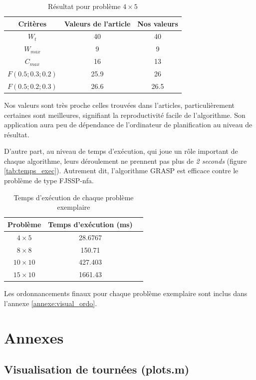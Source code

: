 \documentclass[10pt,a4paper]{scrartcl}
\begin{document}
\begin{table}[!h]
  \centering
  \begin{tabular}{|c|c|c|}
    \hline
    Critères & Valeurs de l'article & Nos valeurs \\
    \hline
    $W_t$ & 40 & 40 \\
    $W_{max}$ & 9 & 9 \\
    $C_{max}$ & 16 & 13 \\
    $F(0.5;0.3;0.2)$ & 25.9 & 26 \\
    $F(0.5;0.2;0.3)$ & 26.6 & 26.5 \\
    \hline
  \end{tabular}
  \caption{Résultat pour problème $4 \times 5$}
\end{table}

Nos valeurs sont très proche celles trouvées dans l'articles, particulièrement certaines sont meilleures, signifiant la reproductivité facile de l'algorithme. Son application aura peu de dépendance de l'ordinateur de planification au niveau de résultat.

D'autre part, au niveau de temps d'exécution, qui joue un rôle important de chaque algorithme, leurs déroulement ne prennent pas plus de \emph{2 seconds} (figure \eqref{tab:temps_exec}). Autrement dit, l'algorithme GRASP est efficace contre le problème de type FJSSP-nfa.

\begin{table}[!h]
  \centering
  \begin{tabular}{|c|c|c|}
    \hline
    Problème & Temps d'exécution (ms) \\
    \hline
    $4 \times 5$ & 28.6767 \\
    $8 \times 8$ & 150.71 \\
    $10 \times 10$ & 427.403 \\
    $15 \times 10$ & 1661.43 \\
    \hline
  \end{tabular}
  \caption{Temps d'exécution de chaque problème exemplaire}
  \label{tab:temps_exec}
\end{table}

Les ordonnancements finaux pour chaque problème exemplaire sont inclus dans l'annexe \eqref{annexe:visual_ordo}.

\section{Annexes}

\subsection{Visualisation de tournées (plots.m)}

\end{document}
